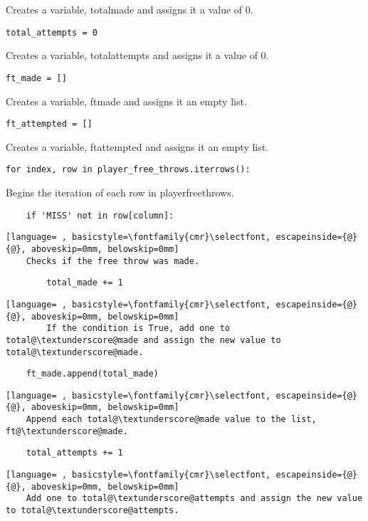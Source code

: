 \documentclass{article}
\begin{document}
Creates a variable, total\textunderscore made and assigns it a value of 0.
\begin{lstlisting}
total_attempts = 0
\end{lstlisting}
Creates a variable, total\textunderscore attempts and assigns it a value of 0.
\begin{lstlisting}
ft_made = []
\end{lstlisting}
Creates a variable, ft\textunderscore made and assigns it an empty list.
\begin{lstlisting}
ft_attempted = []
\end{lstlisting}
Creates a variable, ft\textunderscore attempted and assigns it an empty list.
\begin{lstlisting}
for index, row in player_free_throws.iterrows():
\end{lstlisting}
Begins the iteration of each row in player\textunderscore free\textunderscore throws.
\begin{lstlisting}
    if 'MISS' not in row[column]:
\end{lstlisting}
\begin{lstlisting}[language= , basicstyle=\fontfamily{cmr}\selectfont, escapeinside={@}{@}, aboveskip=0mm, belowskip=0mm]
    Checks if the free throw was made.
\end{lstlisting}
\begin{lstlisting}
        total_made += 1
\end{lstlisting}
\begin{lstlisting}[language= , basicstyle=\fontfamily{cmr}\selectfont, escapeinside={@}{@}, aboveskip=0mm, belowskip=0mm]
        If the condition is True, add one to total@\textunderscore@made and assign the new value to total@\textunderscore@made.
\end{lstlisting}
\begin{lstlisting}
    ft_made.append(total_made)
\end{lstlisting}
\begin{lstlisting}[language= , basicstyle=\fontfamily{cmr}\selectfont, escapeinside={@}{@}, aboveskip=0mm, belowskip=0mm]
    Append each total@\textunderscore@made value to the list, ft@\textunderscore@made.
\end{lstlisting}
\begin{lstlisting}
    total_attempts += 1
\end{lstlisting}
\begin{lstlisting}[language= , basicstyle=\fontfamily{cmr}\selectfont, escapeinside={@}{@}, aboveskip=0mm, belowskip=0mm]
    Add one to total@\textunderscore@attempts and assign the new value to total@\textunderscore@attempts.
\end{lstlisting}
\end{document}
